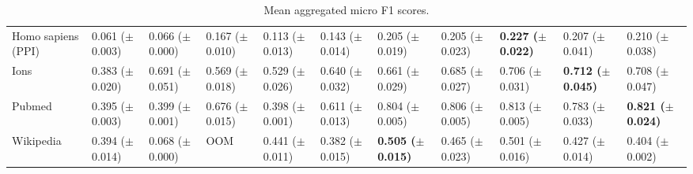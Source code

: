 \documentclass[twoside,11pt]{article}
\begin{document}
\begin{table}[htb!]
{\begin{tabular}{lllllllllll}
Homo sapiens (PPI) &  0.061 ($\pm$0.003) &    0.066 ($\pm$0.000) &   0.167 ($\pm$0.010) &  0.113 ($\pm$0.013) &  0.143 ($\pm$0.014) &  0.205 ($\pm$0.019) &  0.205 ($\pm$0.023) &\bfseries  0.227 ($\pm$0.022) &  0.207 ($\pm$0.041) &  0.210 ($\pm$ 0.038)\\
Ions               &   0.383 ($\pm$0.020) &  0.691 ($\pm$0.051) &  0.569 ($\pm$0.018) &  0.529 ($\pm$0.026) &   0.640 ($\pm$0.032) &  0.661 ($\pm$0.029) &  0.685 ($\pm$ 0.027) &  0.706 ($\pm$0.031) &\bfseries  0.712 ($\pm$0.045) &  0.708 ($\pm$ 0.047)\\
Pubmed             &  0.395 ($\pm$0.003) &  0.399 ($\pm$0.001) &  0.676 ($\pm$0.015) &  0.398 ($\pm$0.001) &  0.611 ($\pm$0.013) &  0.804 ($\pm$0.005) &  0.806 ($\pm$0.005) &  0.813 ($\pm$0.005) &  0.783 ($\pm$0.033) &\bfseries  0.821 ($\pm$ 0.024)\\
Wikipedia          &  0.394 ($\pm$0.014) &    0.068 ($\pm$0.000) &              OOM &  0.441 ($\pm$0.011) &  0.382 ($\pm$0.015) &\bfseries  0.505 ($\pm$0.015) &  0.465 ($\pm$0.023) &  0.501 ($\pm$0.016) &  0.427 ($\pm$0.014) &  0.404 ($\pm$ 0.002)\\
\bottomrule
\end{tabular}
} 	\caption{Mean aggregated micro F1 scores.}
	\label{tab-micro}
\end{table}
\end{document}
